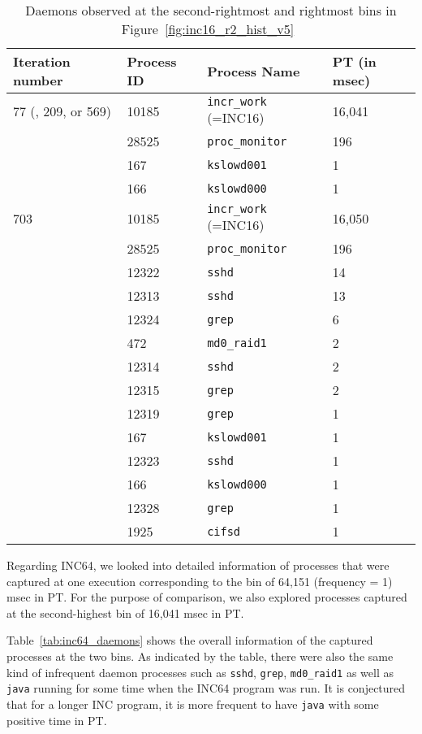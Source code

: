 \begin{table}[h]
\begin{center}
\begin{tabular}{|l|l|l|l|} \hline
Iteration number &  Process ID & Process Name  & PT (in msec)\\ \hline
77 (, 209, or 569) & 10185 & {\tt incr\_work} (=INC16) & 16,041 \\ \hline
& 28525 & {\tt proc\_monitor} & 196 \\ \hline
& 167 & {\tt kslowd001} &  1 \\ \hline
& 166 & {\tt kslowd000} &  1 \\ \hline \hline 
703 & 10185 & {\tt incr\_work} (=INC16) & 16,050 \\ \hline
& 28525 & {\tt proc\_monitor} & 196 \\ \hline
& 12322 & {\tt sshd} & 14 \\ \hline
& 12313 & {\tt sshd}  & 13 \\ \hline
& 12324 & {\tt grep}  &  6 \\ \hline
& 472 & {\tt md0\_raid1} &  2 \\ \hline
& 12314 & {\tt sshd}  &  2 \\ \hline
& 12315 & {\tt grep}  &  2 \\ \hline
& 12319 & {\tt grep}  &  1 \\ \hline
& 167 & {\tt kslowd001} &  1 \\ \hline
& 12323 & {\tt sshd}  &  1 \\ \hline
& 166 & {\tt kslowd000} &  1 \\ \hline
& 12328 & {\tt grep}  &  1 \\ \hline
& 1925 & {\tt cifsd} &  1 \\ \hline 
\hline
\end{tabular}
\end{center}
\caption{Daemons observed at the second-rightmost and rightmost bins in Figure~\ref{fig:inc16_r2_hist_v5}~\label{tab:inc16_daemons}}
\end{table}

Regarding INC64, we looked into detailed information of processes that were 
captured at one execution corresponding to the bin of 64,151 (frequency = 1) msec in PT. 
For the purpose of comparison, we also explored processes captured 
at the second-highest bin of 16,041 msec in PT. 

Table~\ref{tab:inc64_daemons} shows the overall information of the captured processes at the two bins. 
As indicated by the table, there were also 
the same kind of infrequent daemon processes such as {\tt sshd}, {\tt grep}, {\tt md0\_raid1} as well as 
{\tt java} running for some time when the INC64 program was run. 
It is conjectured that for a longer INC program, it is more frequent to have {\tt java} with some positive time in PT. 

